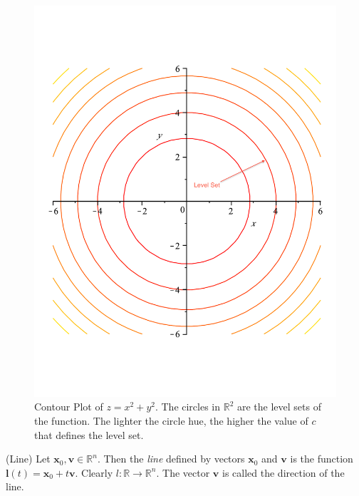 \begin{example}
\begin{figure}[ht]
\end{figure}
\begin{figure}[ht]
\centering
\includegraphics[scale=0.25]{ContourPlotNote.pdf}
\caption{Contour Plot of $z=x^2 + y^2$. The circles in $\mathbb{R}^2$ are the level sets of the function. The lighter the circle hue, the higher the value of $c$ that defines the level set.}
\label{fig:LevelSet2D}
\end{figure}
\label{ex:LevelSet}
\end{example}

\begin{definition}(Line) Let $\mathbf{x}_0,\mathbf{v} \in \mathbb{R}^n$. Then the \textit{line} defined by vectors $\mathbf{x}_0$ and $\mathbf{v}$ is the function $\mathbf{l}(t) = \mathbf{x}_0 + t\mathbf{v}$. Clearly $l : \mathbb{R} \rightarrow \mathbb{R}^n$. The vector $\mathbf{v}$ is called the direction of the line. 
\label{def:Line}
\end{definition} 

